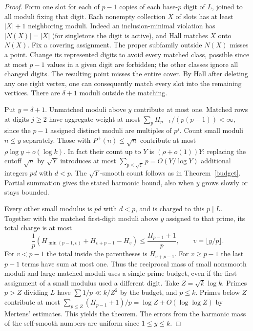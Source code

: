 \documentclass[10pt]{article}
\newcommand{\lp}{P^+}
\begin{document}
\begin{proof}
Form one slot for each of $p-1$ copies of each base-$p$ digit of $L$, joined to all moduli fixing that digit. Each nonempty collection $X$ of slots has at least $|X|+1$ neighboring moduli. Indeed an inclusion-minimal violation has $|N(X)|=|X|$ (for singletons the digit is active), and Hall matches $X$ onto $N(X)$. Fix a covering assignment. The proper subfamily outside $N(X)$ misses a point. Change its represented digits to avoid every matched class, possible since at most $p-1$ values in a given digit are forbidden; the other classes ignore all changed digits. The resulting point misses the entire cover. By Hall after deleting any one right vertex, one can consequently match every slot into the remaining vertices. There are $\delta+1$ moduli outside the matching.

Put $y=\delta+1$. Unmatched moduli above $y$ contribute at most one. Matched rows at digits $j\ge2$ have aggregate weight at most $\sum_p H_{p-1}/(p(p-1))<\infty$, since the $p-1$ assigned distinct moduli are multiples of $p^j$. Count small moduli $n\le y$ separately. Those with $\lp(n)\le\sqrt n$ contribute at most $\rho\log y+o(\log k)$. In fact their count up to $Y$ is $(\rho+o(1))Y$: replacing the cutoff $\sqrt n$ by $\sqrt Y$ introduces at most $\sum_{p\le\sqrt Y}p=O(Y/\log Y)$ additional integers $pd$ with $d<p$. The $\sqrt Y$-smooth count follows as in Theorem~\ref{budget}. Partial summation gives the stated harmonic bound, also when $y$ grows slowly or stays bounded.

Every other small modulus is $pd$ with $d<p$, and is charged to this $p\mid L$. Together with the matched first-digit moduli above $y$ assigned to that prime, its total charge is at most
\[
 \frac1p\left(H_{\min(p-1,v)}+H_{v+p-1}-H_v\right)
 \le \frac{H_{p-1}+1}{p},\qquad v=\lfloor y/p\rfloor.
\]
For $v<p-1$ the total inside the parentheses is $H_{v+p-1}$. For $v\ge p-1$ the last $p-1$ terms have sum at most one. Thus the reciprocal mass of small nonsmooth moduli and large matched moduli uses a single prime budget, even if the first assignment of a small modulus used a different digit. Take $Z=\sqrt k\log k$. Primes $p>Z$ dividing $L$ have $\sum 1/p\ll k/Z^2$ by the budget, and $p\le k$. Primes below $Z$ contribute at most $\sum_{p\le Z}(H_{p-1}+1)/p=\log Z+O(\log\log Z)$ by Mertens' estimates. This yields the theorem. The errors from the harmonic mass of the self-smooth numbers are uniform since $1\le y\le k$.
\end{proof}
\end{document}
